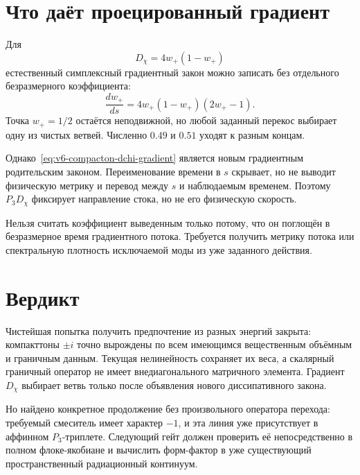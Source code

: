 \section{Что даёт проецированный градиент}

Для
\begin{equation}
 D_\chi=4w_+(1-w_+)
\end{equation}
естественный симплексный градиентный закон можно записать без отдельного
безразмерного коэффициента:
\begin{equation}
 \frac{dw_+}{ds}
 =4w_+(1-w_+)(2w_+-1).
 \label{eq:v6-compacton-dchi-gradient}
\end{equation}
Точка $w_+=1/2$ остаётся неподвижной, но любой заданный перекос выбирает
одну из чистых ветвей. Численно $0.49$ и $0.51$ уходят к разным концам.

Однако~\eqref{eq:v6-compacton-dchi-gradient} является новым
градиентным родительским законом. Переименование времени в $s$ скрывает,
но не выводит физическую метрику и перевод между $s$ и наблюдаемым
временем. Поэтому $P_3D_\chi$ фиксирует направление стока, но не его
физическую скорость.

\begin{nogocriterion}
Нельзя считать коэффициент выведенным только потому, что он поглощён в
безразмерное время градиентного потока. Требуется получить метрику потока
или спектральную плотность исключаемой моды из уже заданного действия.
\end{nogocriterion}

\section{Вердикт}

Чистейшая попытка получить предпочтение из разных энергий закрыта:
компакттоны $\pm i$ точно вырождены по всем имеющимся вещественным
объёмным и граничным данным. Текущая нелинейность сохраняет их веса, а
скалярный граничный оператор не имеет внедиагонального матричного
элемента. Градиент $D_\chi$ выбирает ветвь только после объявления нового
диссипативного закона.

Но найдено конкретное продолжение без произвольного оператора перехода:
требуемый смеситель имеет характер $-1$, и эта линия уже присутствует в
аффинном $P_3$-триплете. Следующий гейт
должен проверить её непосредственно в полном флоке-якобиане и вычислить
форм-фактор в уже существующий пространственный радиационный континуум.

